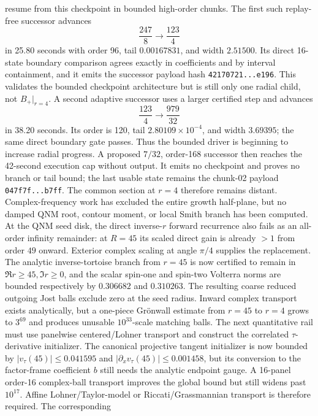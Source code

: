 \documentclass[11pt]{article}
\theoremstyle{definition}
\theoremstyle{remark}
\begin{document}
resume from this checkpoint in bounded high-order chunks.  The
first such replay-free successor advances
\[
 \frac{247}{8}\longrightarrow\frac{123}{4}
\]
in 25.80 seconds with order 96, tail \(0.00167831\), and width \(2.51500\).
Its direct 16-state boundary comparison agrees exactly in coefficients and
by interval containment, and it emits the successor payload hash
\texttt{42170721...e196}.  This validates the bounded checkpoint architecture
but is still only one radial child, not \(B_+|_{r=4}\).  A second adaptive
successor uses a larger certified step and advances
\[
 \frac{123}{4}\longrightarrow\frac{979}{32}
\]
in 38.20 seconds.  Its order is 120, tail \(2.80109\times10^{-4}\), and
width \(3.69395\); the same direct boundary gate passes.  Thus the bounded
driver is beginning to increase radial progress.  A proposed \(7/32\),
order-168 successor then reaches the 42-second execution cap without output.
It emits no checkpoint and proves no branch or tail bound; the last usable
state remains the chunk-02 payload \texttt{047f7f...b7ff}.  The common
section at \(r=4\) therefore remains distant.
Complex-frequency work has excluded the entire growth half-plane, but no
damped QNM root, contour moment, or local Smith branch has been computed.
At the QNM seed disk, the direct inverse-\(r\) forward recurrence also fails
as an all-order infinity remainder: at \(R=45\) its scaled direct gain is
already \(>1\) from order \(49\) onward.  Exterior complex scaling at angle
\(\pi/4\) supplies the replacement.  The analytic inverse-tortoise branch
from \(r=45\) is now certified to remain in
\(\Re r\ge45,\Im r\ge0\), and the scalar spin-one and spin-two Volterra norms
are bounded respectively by \(0.306682\) and \(0.310263\).  The resulting
coarse reduced outgoing Jost balls exclude zero at the seed radius.  Inward
complex transport exists analytically, but a one-piece Gr\"onwall estimate
from \(r=45\) to \(r=4\) grows to \(3^{69}\) and produces unusable
\(10^{33}\)-scale matching balls.  The next quantitative rail must use
panelwise centered/Lohner transport and construct the correlated
\(\tau\)-derivative initializer.  The canonical projective tangent
initializer is now bounded by
\(\lvert v_\tau(45)\rvert\le0.041595\) and
\(\lvert\partial_xv_\tau(45)\rvert\le0.001458\), but its conversion to the
factor-frame coefficient \(b\) still needs the analytic endpoint gauge.  A
16-panel order-16 complex-ball transport improves the global bound but still
widens past \(10^{17}\).  Affine Lohner/Taylor-model or
Riccati/Grassmannian transport is therefore required.  The corresponding
\end{document}
